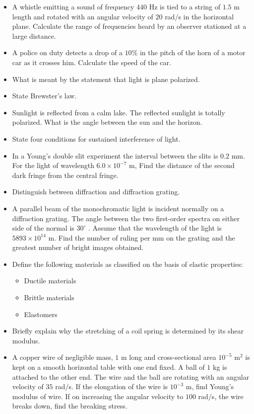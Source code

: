 \documentclass{article}
\begin{document}
\begin{itemize}
\item A whistle emitting a sound of frequency $ 440$ Hz is tied to a string of $ 1.5$ m length and rotated with an angular velocity of $ 20$ rad$/$s in the horizontal plane.  Calculate the range of frequencies heard by an observer stationed at a large distance.
\item A police on duty detects a drop of a $ 10\%$ in the pitch of the horn of a motor car as it crosses him. Calculate the speed of the car.
\item What is meant by the statement that light is plane polarized.
\item State Brewster’s law.
\item Sunlight is reflected from a calm lake.  The reflected sunlight is totally polarized.  What is the angle between the sun and the horizon.
\item State four conditions for sustained interference of light.
\item In a Young’s double slit experiment the interval between the slits is $ 0.2$ mm.  For the light of wavelength $ 6.0\times 10^{-7}$ m, Find the distance of the second dark fringe from the central fringe.
\item Distinguish between diffraction and diffraction grating.
\item A parallel beam of the monochromatic light is incident normally on a diffraction grating.  The angle between the two first-order spectra on either side of the normal is $ 30^{\circ}$ .  Assume that the wavelength of the light is $ 5893\times 10^{14}$ m. Find the number of ruling per mm on the grating and the greatest number of bright images obtained. 
\item Define the following materials as classified on the basis of elastic properties:
 \begin{itemize}
\item  Ductile materials 
\item Brittle materials
\item Elastomers
\end{itemize}
\item Briefly explain why the stretching of a coil spring is determined by its shear modulus.
\item A copper wire of negligible mass, $ 1$ m long and cross-sectional area $ 10^{-5}$ m$ ^{2}$ is kept on a smooth horizontal table with one end fixed.  A ball of $ 1$ kg is attached to the other end.  The wire and the ball are rotating with an angular velocity of $ 35$ rad$/$s.  If the elongation of the wire is $ 10^{-3}$ m, find Young’s modulus of wire.  If on increasing the angular velocity to $ 100$ rad$/$s, the wire breaks down, find the breaking stress.

\end{itemize}
\end{document}
